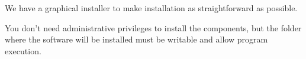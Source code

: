We have a graphical installer to make installation as straightforward as possible. 

You don't need administrative privileges to install the components, but the folder where the software will be installed must be writable and allow program execution.
